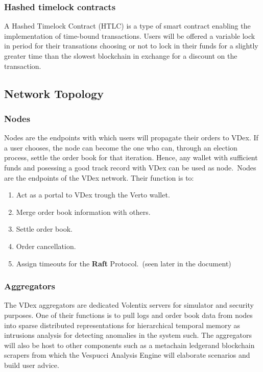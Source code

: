 \documentclass[]{article}
\begin{document}
	\subsubsection{Hashed timelock contracts}
	A Hashed Timelock Contract (HTLC)\cite{22} is a type of smart contract enabling the implementation of time-bound transactions.
	Users will be offered a variable lock in period for their transations choosing or not
	to lock in their funds for a slightly greater time than the slowest blockchain in exchange for a discount on the transaction.
	
	\subsection{Network Topology}
	\subsubsection{Nodes}
	Nodes are the endpoints with which users will propagate their orders to VDex. If a user chooses, the node can become the one who can, through an election process, settle the order book
	for that iteration.   
	Hence, any wallet with sufficient funds and posessing a good track record with VDex can be used as node.\
	Nodes are the endpoints of the VDex network.
	Their function is to:\
	\begin{enumerate}
		\item Act as a portal to VDex trough the Verto wallet.
		\item Merge order book information with others.
		\item Settle order book.\
		\item Order cancellation.\
		\item Assign timeouts for the \textbf{Raft} Protocol.\ (seen later in the document)
	\end{enumerate}
	
	\subsubsection{Aggregators}
	
	The VDex aggregators are dedicated Volentix servers for simulator and security purposes. 
	One of their functions is to pull logs and order book data from nodes into sparse distributed representations for hierarchical temporal memory as intrusions \cite{24} analysis for detecting anomalies in the system such. The aggregators will also be host to other components such as a metachain ledger\cite{20}and blockchain scrapers from which the Vespucci Analysis Engine will elaborate scenarios and build user advice.
	
\end{document}
